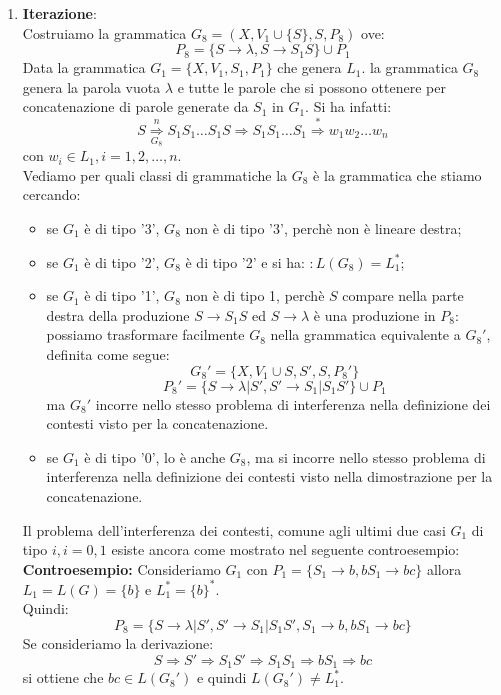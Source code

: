 \documentclass[12pt]{report}
\begin{document}
{{{\begin{enumerate}
 			\item \textbf{Iterazione}: \\
 			Costruiamo la grammatica $G_8 = (X, V_1 \cup \{S\}, S, P_8)$ ove:
 			\[
 			P_8 = \{S \to \lambda, S \to S_1S\} \cup P_1
 			\]
 			Data la grammatica $G_1=\{X, V_1, S_1, P_1\}$ che genera $L_1$. la grammatica $G_8$ genera la parola vuota $\lambda$ e tutte le parole che si possono ottenere per concatenazione di parole generate da $S_1$ in $G_1$. Si ha infatti:
 			\[
 			S \overset{n}{\underset{G_8}{\Rightarrow}}S_1S_1\dots S_1S \Rightarrow S_1S_1\dots S_1 \overset{*}{\Rightarrow} w_1w_2\dots w_n
 			\]
 			con $w_i \in L_1, i = 1, 2, \dots, n$. \\
 			Vediamo per quali classi di grammatiche la $G_8$ è la grammatica che stiamo cercando:
 			\begin{itemize}
 				\item se $G_1$ è di tipo '3', $G_8$ non è di tipo '3', perchè non è lineare destra;
 				\item se $G_1$ è di tipo '2', $G_8$ è di tipo '2' e si ha: $:L(G_8) = L_1^*$;
 				\item se $G_1$ è di tipo '1', $G_8$ non è di tipo 1, perchè $S$ compare nella parte destra della produzione $S \to S_1S$ ed $S \to \lambda$ è una produzione in $P_8$: possiamo trasformare facilmente $G_8$ nella grammatica equivalente a $G_8'$, definita come segue:
 				\[
 				G_8'= \{X, V_1 \cup {S, S'}, S,P_8'\}
 				\]
 				\[
 				P_8' = \{S \to \lambda | S', S'\to S_1 | S_1S'\} \cup P_1
 				\]
 				ma $G_8'$ incorre nello stesso problema di interferenza nella definizione dei contesti visto per la concatenazione.
 				\item se $G_1$ è di tipo '0', lo è anche $G_8$, ma si incorre nello stesso problema di interferenza nella definizione dei contesti visto nella dimostrazione per la concatenazione.
 			\end{itemize}
 			Il problema dell'interferenza dei contesti, comune agli ultimi due casi $G_1$ di tipo $i, i=0,1$ esiste ancora come mostrato nel seguente controesempio: \\
 			\textbf{Controesempio:} Consideriamo $G_1$ con $P_1 = \{S_1 \to b, bS_1 \to bc\}$ allora $L_1 = L(G) = \{b\}$ e $L_1^* = \{b\}^*$. \\
 			Quindi:
 			\[
 			P_8 = \{S \to \lambda|S', S'\to S_1|S_1S', S_1 \to b, bS_1 \to bc\}
 			\]
 			Se consideriamo la derivazione:
 			\[
 			S \Rightarrow S'\Rightarrow S_1S' \Rightarrow S_1S_1 \Rightarrow bS_1 \Rightarrow bc
 			\]
 			si ottiene che $bc \in L(G_8')$ e quindi $L(G_8') \neq L_1^*$. \\

\end{enumerate}}}}
\end{document}
